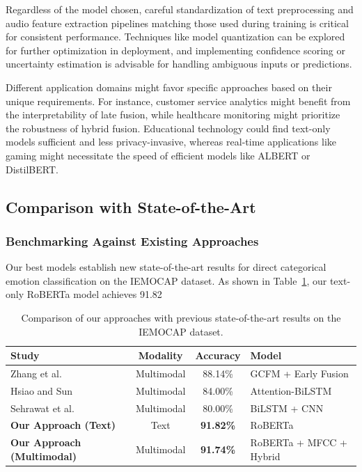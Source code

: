 \documentclass[12pt]{article}
\begin{document}
Regardless of the model chosen, careful standardization of text preprocessing and audio feature extraction pipelines matching those used during training is critical for consistent performance. Techniques like model quantization can be explored for further optimization in deployment, and implementing confidence scoring or uncertainty estimation is advisable for handling ambiguous inputs or predictions.

Different application domains might favor specific approaches based on their unique requirements. For instance, customer service analytics might benefit from the interpretability of late fusion, while healthcare monitoring might prioritize the robustness of hybrid fusion. Educational technology could find text-only models sufficient and less privacy-invasive, whereas real-time applications like gaming might necessitate the speed of efficient models like ALBERT or DistilBERT.

\subsection{Comparison with State-of-the-Art}

\subsubsection{Benchmarking Against Existing Approaches}
Our best models establish new state-of-the-art results for direct categorical emotion classification on the IEMOCAP dataset. As shown in Table~\ref{tab:sota_comparison}, our text-only RoBERTa model achieves 91.82%

\begin{table}[h]
\centering
\begin{tabular}{|l|c|c|l|}
\hline
\textbf{Study} & \textbf{Modality} & \textbf{Accuracy} & \textbf{Model} \\
\hline
Zhang et al.~\cite{zhang2022fine} & Multimodal & 88.14\% & GCFM + Early Fusion \\
\hline
Hsiao and Sun~\cite{hsiao2022attention} & Multimodal & 84.00\% & Attention-BiLSTM \\
\hline
Sehrawat et al.~\cite{sehrawat2023deception} & Multimodal & 80.00\% & BiLSTM + CNN \\
\hline
\textbf{Our Approach (Text)} & Text & \textbf{91.82\%} & RoBERTa \\
\hline
\textbf{Our Approach (Multimodal)} & Multimodal & \textbf{91.74\%} & RoBERTa + MFCC + Hybrid \\
\hline
\end{tabular}
\caption{Comparison of our approaches with previous state-of-the-art results on the IEMOCAP dataset.}
\label{tab:sota_comparison}
\end{table}
\end{document}
